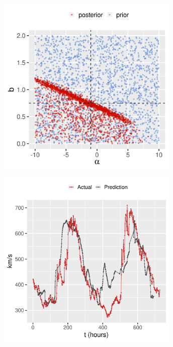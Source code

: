 \documentclass[a4paper]{article}            %
\begin{document}
\begin{slidetop}
    \begin{center}
        \includegraphics[width=0.65\textwidth]{prior_posterior_scatter_Q_alpha_b.png}%
    \end{center}
    
\end{slidetop}

\begin{slidetop}
    \begin{center}
        \includegraphics[width=0.65\textwidth]{test_2016-11-16_2016-12-17_ts.pdf}%
    \end{center}
    
\end{slidetop}
\end{document}
